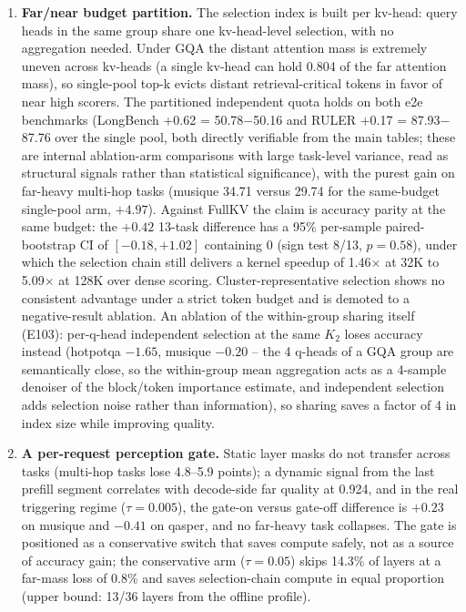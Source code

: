 \documentclass[11pt]{article}
\begin{document}
\begin{enumerate}
\item \textbf{Far/near budget partition.} The selection index is built per kv-head: query heads in the same group share one kv-head-level selection, with no aggregation needed. Under GQA the distant attention mass is extremely uneven across kv-heads (a single kv-head can hold 0.804 of the far attention mass), so single-pool top-k evicts distant retrieval-critical tokens in favor of near high scorers. The partitioned independent quota holds on both e2e benchmarks (LongBench +0.62 = 50.78$-$50.16 and RULER +0.17 = 87.93$-$87.76 over the single pool, both directly verifiable from the main tables; these are internal ablation-arm comparisons with large task-level variance, read as structural signals rather than statistical significance), with the purest gain on far-heavy multi-hop tasks (musique 34.71 versus 29.74 for the same-budget single-pool arm, $+4.97$). Against FullKV the claim is accuracy parity at the same budget: the $+0.42$ 13-task difference has a 95\% per-sample paired-bootstrap CI of $[-0.18, +1.02]$ containing 0 (sign test 8/13, $p{=}0.58$), under which the selection chain still delivers a kernel speedup of 1.46$\times$ at 32K to 5.09$\times$ at 128K over dense scoring. Cluster-representative selection shows no consistent advantage under a strict token budget and is demoted to a negative-result ablation. An ablation of the within-group sharing itself (E103): per-q-head independent selection at the same $K_2$ loses accuracy instead (hotpotqa $-1.65$, musique $-0.20$ -- the 4 q-heads of a GQA group are semantically close, so the within-group mean aggregation acts as a 4-sample denoiser of the block/token importance estimate, and independent selection adds selection noise rather than information), so sharing saves a factor of 4 in index size while improving quality.
\item \textbf{A per-request perception gate.} Static layer masks do not transfer across tasks (multi-hop tasks lose 4.8--5.9 points); a dynamic signal from the last prefill segment correlates with decode-side far quality at 0.924, and in the real triggering regime ($\tau{=}0.005$), the gate-on versus gate-off difference is $+0.23$ on musique and $-0.41$ on qasper, and no far-heavy task collapses. The gate is positioned as a conservative switch that saves compute safely, not as a source of accuracy gain; the conservative arm ($\tau{=}0.05$) skips 14.3\% of layers at a far-mass loss of 0.8\% and saves selection-chain compute in equal proportion (upper bound: 13/36 layers from the offline profile).

\end{enumerate}
\end{document}
